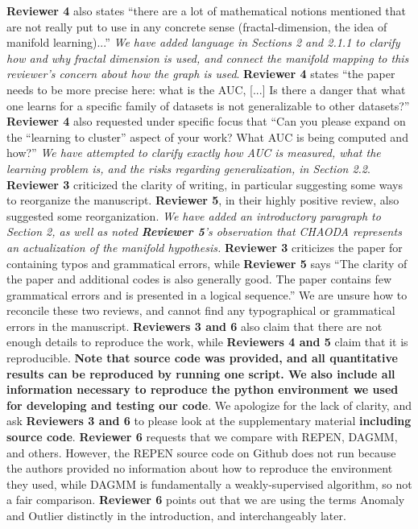 \documentclass{article}
\begin{document}
\textbf{Reviewer 4} also states ``there are a lot of mathematical notions mentioned that are not really put to use in any concrete sense (fractal-dimension, the idea of manifold learning)...''
\emph{We have added language in Sections 2 and 2.1.1 to clarify how and why fractal dimension is used, and connect the manifold mapping to this reviewer's concern about how the graph is used}.
\textbf{Reviewer 4} states ``the paper needs to be more precise here: what is the AUC, [...] Is there a danger that what one learns for a specific family of datasets is not generalizable to other datasets?''
\textbf{Reviewer 4} also requested under specific focus that ``Can you please expand on the ``learning to cluster'' aspect of your work? What AUC is being computed and how?''
\emph{We have attempted to clarify exactly how AUC is measured, what the learning problem is, and the risks regarding generalization, in Section 2.2}.
\textbf{Reviewer 3} criticized the clarity of writing, in particular suggesting some ways to reorganize the manuscript.
\textbf{Reviewer 5}, in their highly positive review, also suggested some reorganization.
\emph{We have added an introductory paragraph to Section 2, as well as noted \textbf{Reviewer 5}'s observation that CHAODA represents an actualization of the manifold hypothesis.}
\textbf{Reviewer 3} criticizes the paper for containing typos and grammatical errors, while \textbf{Reviewer 5} says ``The clarity of the paper and additional codes is also generally good. The paper contains few grammatical errors and is presented in a logical sequence.''
We are unsure how to reconcile these two reviews, and cannot find any typographical or grammatical errors in the manuscript.
\textbf{Reviewers 3 and 6} also claim that there are not enough details to reproduce the work, while \textbf{Reviewers 4 and 5} claim that it is reproducible.
\textbf{Note that source code was provided, and all quantitative results can be reproduced by running one script.
We also include all information necessary to reproduce the python environment we used for developing and testing our code}.
We apologize for the lack of clarity, and ask \textbf{Reviewers 3 and 6} to please look at the supplementary material \textbf{including source code}.
\textbf{Reviewer 6} requests that we compare with REPEN, DAGMM, and others.
However, the REPEN source code on Github does not run because the authors provided no information about how to reproduce the environment they used, while DAGMM is fundamentally a weakly-supervised algorithm, so not a fair comparison.
\textbf{Reviewer 6} points out that we are using the terms Anomaly and Outlier distinctly in the introduction, and interchangeably later.
\end{document}
